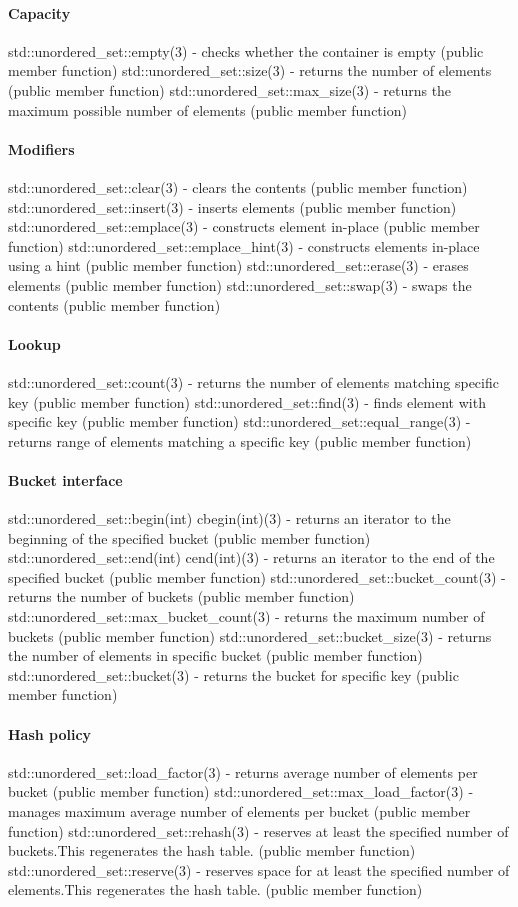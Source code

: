\paragraph{Capacity}
std::unordered\_set::empty(3) - checks whether the container is empty   (public member function)
std::unordered\_set::size(3) - returns the number of elements   (public member function)
std::unordered\_set::max\_size(3) - returns the maximum possible number of elements   (public member function)
\paragraph{Modifiers}
std::unordered\_set::clear(3) - clears the contents   (public member function)
std::unordered\_set::insert(3) - inserts elements   (public member function)
std::unordered\_set::emplace(3) - constructs element in-place   (public member function)
std::unordered\_set::emplace\_hint(3) - constructs elements in-place using a hint   (public member function)
std::unordered\_set::erase(3) - erases elements   (public member function)
std::unordered\_set::swap(3) - swaps the contents   (public member function)
\paragraph{Lookup}
std::unordered\_set::count(3) - returns the number of elements matching specific key   (public member function)
std::unordered\_set::find(3) - finds element with specific key  (public member function)
std::unordered\_set::equal\_range(3) - returns range of elements matching a specific key  (public member function)
\paragraph{Bucket interface}
std::unordered\_set::begin(int) cbegin(int)(3) - returns an iterator to the beginning of the specified bucket   (public member function)
std::unordered\_set::end(int) cend(int)(3) - returns an iterator to the end of the specified bucket   (public member function)
std::unordered\_set::bucket\_count(3) - returns the number of buckets  (public member function)
std::unordered\_set::max\_bucket\_count(3) - returns the maximum number of buckets  (public member function)
std::unordered\_set::bucket\_size(3) - returns the number of elements in specific bucket  (public member function)
std::unordered\_set::bucket(3) - returns the bucket for specific key  (public member function)
\paragraph{Hash policy}
std::unordered\_set::load\_factor(3) - returns average number of elements per bucket  (public member function)
std::unordered\_set::max\_load\_factor(3) - manages maximum average number of elements per bucket  (public member function)
std::unordered\_set::rehash(3) - reserves at least the specified number of buckets.This regenerates the hash table.  (public member function)
std::unordered\_set::reserve(3) - reserves space for at least the specified number of elements.This regenerates the hash table.  (public member function)
